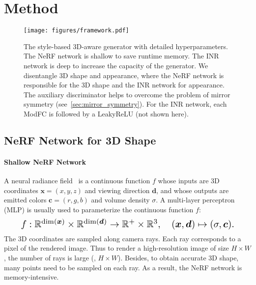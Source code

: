 \documentclass[10pt,twocolumn,letterpaper]{article}
\def\vc{{\bm{c}}}
\def\vd{{\bm{d}}}
\def\vx{{\bm{x}}}
\newcommand{\R}{\mathbb{R}}
\begin{document}
\section{Method}

\begin{figure*}[!t]
  \begin{center}
\texttt{[image: figures/framework.pdf]}
  \end{center}
  \vspace{-0.65cm}
  \caption{The style-based 3D-aware generator with detailed hyperparameters. The NeRF network is shallow to save runtime memory. The INR network is deep to increase the capacity of the generator. We disentangle 3D shape and appearance, where the NeRF network is responsible for the 3D shape and the INR network for appearance. The auxiliary discriminator helps to overcome the problem of mirror symmetry (see~\cref{sec:mirror_symmetry}). For the INR network, each ModFC is followed by a LeakyReLU (not shown here). }
  \vspace{-0.5cm}
  \label{fig:framework}
\end{figure*}



\subsection{NeRF Network for 3D Shape}


\paragraph{Shallow NeRF Network}

A neural radiance field~\cite{mildenhall2020NeRF} is a continuous function $f$ whose inputs are 3D coordinates $\vx=(x, y, z)$ and viewing direction $\vd$, and whose outputs are emitted colors $\vc=(r, g, b)$ and volume density $\sigma$. A multi-layer perceptron (MLP) is usually used to parameterize the continuous function $f$:
\begin{equation}
  \resizebox{0.9\hsize}{!}{$
      f: \R^{\mathrm{dim}(\vx)} \times \R^{\mathrm{dim}(\vd)} \rightarrow \R^+ \times \R^3,\quad
      (\vx, \vd) \mapsto(\sigma, \vc).
    $}
\end{equation}
The 3D coordinates are sampled along camera rays. Each ray corresponds to a pixel of the rendered image. Thus to render a high-resolution image of size $H \times W$, the number of rays is large (\ie, $H \times W$). Besides, to obtain accurate 3D shape, many points need to be sampled on each ray. As a result, the NeRF network is memory-intensive.
\end{document}
